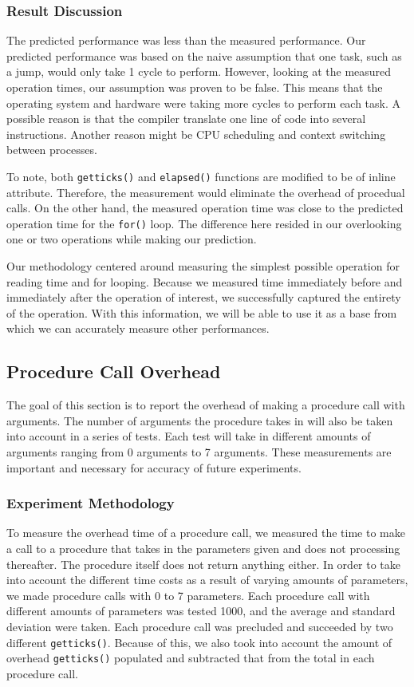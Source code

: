 \documentclass{article} %
\begin{document}
\subsubsection{Result Discussion}

The predicted performance was less than the measured performance. Our
predicted performance was based on the naive assumption that one task, such as
a jump, would only take 1 cycle to perform. However, looking at the measured
operation times, our assumption was proven to be false. This means that the
operating system and hardware were taking more cycles to perform each task.
A possible reason is that the compiler translate one line of code into several
instructions. Another reason might be CPU scheduling and context switching
between processes.

To note, both \texttt{getticks()} and \texttt{elapsed()} functions are
modified to be of inline attribute. Therefore, the measurement would eliminate
the overhead of procedual calls. On the other hand, the measured operation
time was close to the predicted operation time for the \texttt{for()} loop.
The difference here resided in our overlooking one or two operations while
making our prediction.

Our methodology centered around measuring the simplest possible operation for
reading time and for looping. Because we measured time immediately before and
immediately after the operation of interest, we successfully captured the
entirety of the operation. With this information, we will be able to use it as
a base from which we can accurately measure other performances.

\subsection{Procedure Call Overhead}
The goal of this section is to report the overhead of making a procedure call
with arguments. The number of arguments the procedure takes in will also be
taken into account in a series of tests. Each test will take in different
amounts of arguments ranging from 0 arguments to 7 arguments. These
measurements are important and necessary for accuracy of future experiments.

\subsubsection{Experiment Methodology}
To measure the overhead time of a procedure call, we measured the time to make
a call to a procedure that takes in the parameters given and does not
processing thereafter. The procedure itself does not return anything either.
In order to take into account the different time costs as a result of varying
amounts of parameters, we made procedure calls with 0 to 7 parameters. Each
procedure call with different amounts of parameters was tested 1000, and the
average and standard deviation were taken. Each procedure call was precluded
and succeeded by two different \texttt{getticks()}. Because of this, we also
took into account the amount of overhead \texttt{getticks()} populated and
subtracted that from the total in each procedure call.
\end{document}
